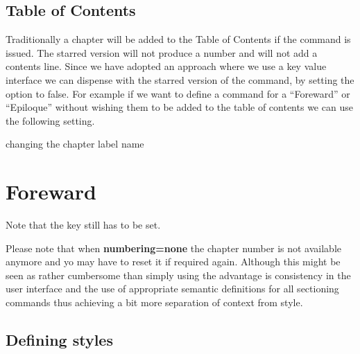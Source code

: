 \lorem 
%
%
%         
%
%



\section{Table of Contents}

Traditionally a chapter will be added to the Table of Contents if the  command is issued. The starred version will not produce a number and will not add a contents line. Since we have adopted an approach where we use a key value interface we can dispense with the starred version of the command, by setting the  option to false. For example if we want to define a command for a ``Foreward'' or ``Epiloque'' without wishing them to be added to the table of contents we can use the following setting.



\begin{texexample}{changing the chapter label name}{}
\chapter{Foreward}
\lorem
\end{texexample}

Note that the key  still has to be set.


Please note that when \textbf{numbering=none} the chapter number is not available anymore and yo may have to reset it if required again. Although this might be seen as rather cumbersome than simply using  the advantage is consistency in the user interface and the use of appropriate semantic definitions for all sectioning commands thus achieving a bit more separation of context from style.



\section{Defining styles}

